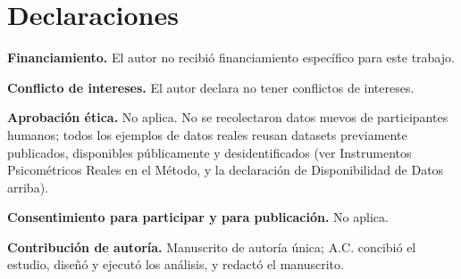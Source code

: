 \documentclass[man,mask,donotrepeattitle,floatsintext]{apa7}
\begin{document}
\section*{Declaraciones}

\textbf{Financiamiento.} El autor no recibió financiamiento específico para este trabajo.

\textbf{Conflicto de intereses.} El autor declara no tener conflictos de intereses.

\textbf{Aprobación ética.} No aplica. No se recolectaron datos nuevos de participantes humanos; todos los ejemplos de datos reales reusan datasets previamente publicados, disponibles públicamente y desidentificados (ver Instrumentos Psicométricos Reales en el Método, y la declaración de Disponibilidad de Datos arriba).

\textbf{Consentimiento para participar y para publicación.} No aplica.

\textbf{Contribución de autoría.} Manuscrito de autoría única; A.C. concibió el estudio, diseñó y ejecutó los análisis, y redactó el manuscrito.

\printbibliography
\end{document}
